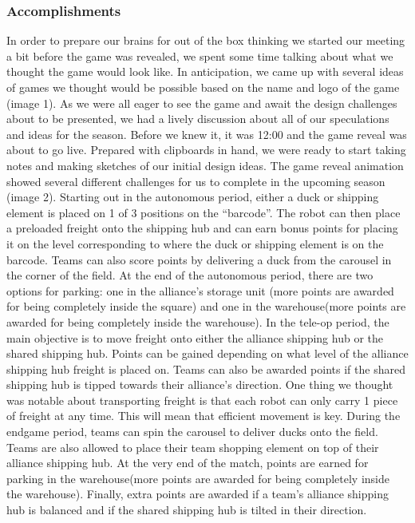 \subsubsection*{Accomplishments}
In order to prepare our brains for out of the box thinking we started our meeting a bit before the game was revealed, we spent some time talking about what we thought the game would look like. In anticipation, we came up with several ideas of games we thought would be possible based on the name and logo of the game (image 1). As we were all eager to see the game and await the design challenges about to be presented, we had a lively discussion about all of our speculations and ideas for the season. Before we knew it, it was 12:00 and the game reveal was about to go live. Prepared with clipboards in hand, we were ready to start taking notes and making sketches of our initial design ideas.
The game reveal animation showed several different challenges for us to complete in the upcoming season (image 2). Starting out in the autonomous period, either a duck or shipping element is placed on 1 of 3 positions on the “barcode”. The robot can then place a preloaded freight onto the shipping hub and can earn bonus points for placing it on the level corresponding to where the duck or shipping element is on the barcode. Teams can also score points by delivering a duck from the carousel in the corner of the field. At the end of the autonomous period, there are two options for parking: one in the alliance’s storage unit (more points are awarded for being completely inside the square) and one in the warehouse(more points are awarded for being completely inside the warehouse).
In the tele-op period, the main objective is to move freight onto either the alliance shipping hub or the shared shipping hub. Points can be gained depending on what level of the alliance shipping hub freight is placed on. Teams can also be awarded points if the shared shipping hub is tipped towards their alliance’s direction. One thing we thought was notable about transporting freight is that each robot can only carry 1 piece of freight at any time. This will mean that efficient movement is key.
During the endgame period, teams can spin the carousel to deliver ducks onto the field. Teams are also allowed to place their team shopping element on top of their alliance shipping hub. At the very end of the match, points are earned for parking in the warehouse(more points are awarded for being completely inside the warehouse). Finally, extra points are awarded if a team’s alliance shipping hub is balanced and if the shared shipping hub is tilted in their direction.
